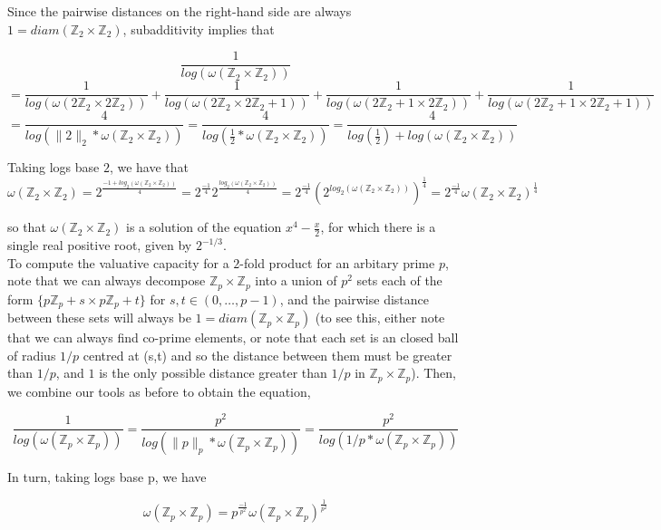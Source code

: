 Since the pairwise distances on the right-hand side are always $1 = diam(\mathbb{Z}_2 \times \mathbb{Z}_2)$, subadditivity implies that 

\[
\frac{1}{log(\omega(\mathbb{Z}_2 \times \mathbb{Z}_2))} \]
\[ = \frac{1}{log(\omega(2\mathbb{Z}_2 \times 2\mathbb{Z}_2))} + \frac{1}{log(\omega(2\mathbb{Z}_2 \times 2\mathbb{Z}_2 +1))} + \frac{1}{log(\omega(2\mathbb{Z}_2+1 \times 2\mathbb{Z}_2))} + \frac{1}{log(\omega(2\mathbb{Z}_2+1 \times 2\mathbb{Z}_2+1))}\]
\[ = \frac{4}{log(\|2\|_2 * \omega(\mathbb{Z}_2 \times \mathbb{Z}_2))} = \frac{4}{log(\frac{1}{2} * \omega(\mathbb{Z}_2 \times \mathbb{Z}_2))} =  \frac{4}{log(\frac{1}{2}) + log(\omega(\mathbb{Z}_2 \times \mathbb{Z}_2))}\]

 Taking logs base $2$, we have that 
\[\omega(\mathbb{Z}_2 \times \mathbb{Z}_2) = 2^{\frac{-1 + log_2(\omega(\mathbb{Z}_2 \times \mathbb{Z}_2))}{4}} =  2^{\frac{-1}{4}} 2^ {\frac{log_2(\omega(\mathbb{Z}_2 \times \mathbb{Z}_2))}{4}}
= 2^{\frac{-1}{4}}{(2^ {log_2(\omega(\mathbb{Z}_2 \times \mathbb{Z}_2))})}^{\frac{1}{4}} = 2^{\frac{-1}{4}}{\omega(\mathbb{Z}_2 \times \mathbb{Z}_2)}^{\frac{1}{4}} \]

so that ${\omega(\mathbb{Z}_2 \times \mathbb{Z}_2)}$ is a solution of the equation $x^4 - \frac{x}{2}$, for which there is a single real positive root, given by $2^{-1/3}$.\\


To compute the valuative capacity for a $2$-fold product for an arbitary prime $p$, note that we can always decompose $\mathbb{Z}_p \times \mathbb{Z}_p$ into a union of $p^2$ sets each of the form $\{p\mathbb{Z}_p+s \times p\mathbb{Z}_p +t\}$ for $s,t \in (0,\ldots, p-1)$, and the pairwise distance between these sets will always be $1 = diam(\mathbb{Z}_p \times \mathbb{Z}_p)$ (to see this, either note that we can always find co-prime elements, or note that each set is an closed ball of radius $1/p$ centred at (s,t) and so the distance between them must be greater than $1/p$, and $1$ is the only possible distance greater than $1/p$ in $\mathbb{Z}_p \times \mathbb{Z}_p$).  Then, we combine our tools as before to obtain the equation,

\[\frac{1}{log(\omega(\mathbb{Z}_p \times \mathbb{Z}_p))} = \frac{p^2}{log(\|p\|_p * \omega(\mathbb{Z}_p \times \mathbb{Z}_p))} =  \frac{p^2}{log(1/p * \omega(\mathbb{Z}_p \times \mathbb{Z}_p))}    \]

In turn, taking logs base p, we have 


\[ \omega(\mathbb{Z}_p \times \mathbb{Z}_p) = p^{\frac{-1}{p^2}} \omega(\mathbb{Z}_p \times \mathbb{Z}_p)^{\frac{1}{p^2}}  \]


